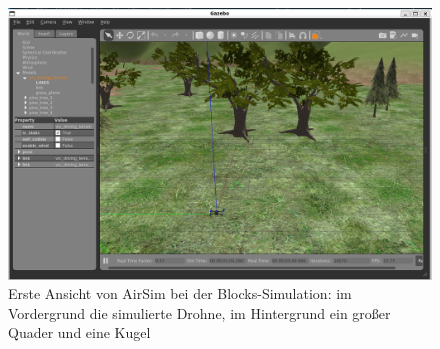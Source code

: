 \begin{figure}[!ht]
    \centering
    \includegraphics[width=\linewidth]{images/sim_gazebo.png}
    \caption[Ansicht Gazebo Simulator]{Erste Ansicht von AirSim bei der Blocks-Simulation: im Vordergrund die simulierte Drohne, im Hintergrund ein großer Quader und eine Kugel}
    \label{fig:sim_airsim}
\end{figure}